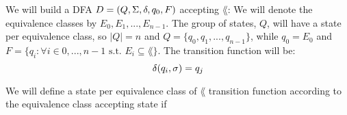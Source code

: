 We will build a DFA $D = (Q, \Sigma, \delta, q_0, F)$ accepting $\lang$:
We will denote the equivalence classes by $E_0, E_1, ... , E_{n-1}$.
The group of states, $Q$, will have a state per equivalence class, so $|Q|=n$
and $Q=\{q_0,q_1,...,q_{n-1}\}$, while $q_0=E_0$
and $F=\{q_i : \forall i \in {0,...,n-1} \text{ s.t. } E_i \subseteq \lang \}$.
The transition function will be:
\[
    \delta(q_i, \sigma) = q_j
\]


We will define a state per equivalence class of $\lang$
transition function according to the equivalence class
accepting state if
